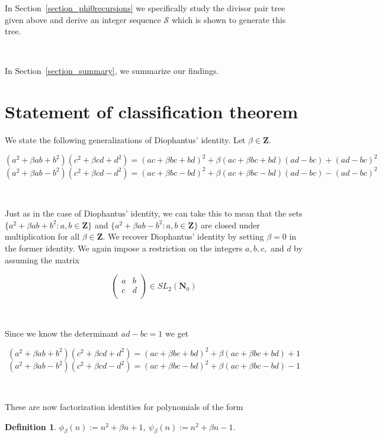 \documentclass{article}
\newtheorem{definition}[theorem]{Definition}  %
\begin{document}
In Section~\ref{section_phi0recursions} we specifically study the divisor pair tree given above and derive an integer sequence $\mathcal{S}$ which is shown to generate this tree.

\

In Section~\ref{section_summary}, we summarize our findings.

\section{Statement of classification theorem}\label{section_class_statement}

We state the following generalizations of Diophantus' identity. Let $\beta \in \mathbf{Z}$.

\[(a^2 + \beta ab + b^2)(c^2 + \beta cd + d^2) = (ac + \beta bc + bd)^2 + \beta (ac + \beta bc + bd)(ad-bc) + (ad - bc)^2\]
\[(a^2 + \beta ab - b^2)(c^2 + \beta cd - d^2) = (ac + \beta bc - bd)^2 + \beta (ac + \beta bc - bd)(ad-bc) - (ad - bc)^2\]

\

Just as in the case of Diophantus' identity, we can take this to mean that the sets $\{a^2 + \beta ab + b^2 : a, b \in \mathbf{Z} \}$ and $\{a^2 + \beta ab - b^2 : a, b \in \mathbf{Z} \}$ are closed under multiplication for all $\beta \in \mathbf{Z}$. We recover Diophantus' identity by setting $\beta = 0$ in the former identity. We again impose a restriction on the integers $a, b, c,$ and $d$ by assuming the matrix

$$\begin{pmatrix}
a & b \\
c & d \\
\end{pmatrix} \in SL_2(\mathbf{N}_0)$$ 

\

Since we know the determinant $ad - bc = 1$ we get

\[ (a^2 + \beta ab + b^2)(c^2 + \beta cd + d^2) = (ac + \beta bc + bd)^2 + \beta (ac + \beta bc + bd) + 1\]
\[(a^2 + \beta ab - b^2)(c^2 + \beta cd - d^2) = (ac + \beta bc - bd)^2 + \beta (ac + \beta bc - bd) - 1\]

\

These are now factorization identities for polynomials of the form

\begin{definition}\label{lilphiandpsi}
$\phi_\beta (n) := n^2 + \beta n + 1$, $\psi_\beta (n) := n^2 + \beta n - 1$. 
\end{definition} 
\end{document}
